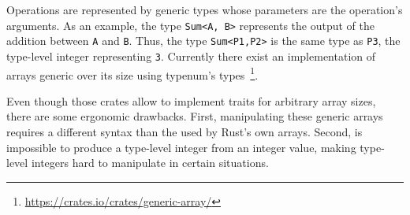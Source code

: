 Operations are represented by generic types whose parameters are the operation's
arguments. As an example, the type \texttt{Sum<A, B>} represents the output of
the addition between \texttt{A} and \texttt{B}. Thus, the type
\texttt{Sum<P1,P2>} is the same type as \texttt{P3}, the type-level integer
representing \texttt{3}. Currently there exist an implementation of arrays
generic over its size using typenum's
types~\footnote{\url{https://crates.io/crates/generic-array/}}.

Even though those crates allow to implement traits for arbitrary array sizes,
there are some ergonomic drawbacks. First, manipulating these generic arrays requires a
different syntax than the used by Rust's own arrays. Second, is impossible to
produce a type-level integer from an integer value, making type-level integers
hard to manipulate in certain situations.
